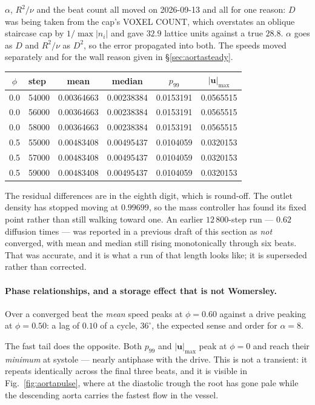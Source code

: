 \documentclass[11pt,a4paper]{article}
\newcommand{\uu}{\bm{u}}
\begin{document}
$\alpha$, $R^2/\nu$ and the beat count all moved on 2026-09-13 and all for one
reason: $D$ was being taken from the cap's VOXEL COUNT, which overstates an
oblique staircase cap by $1/\max|n_i|$ and gave $32.9$ lattice units against a
true $28.8$. $\alpha$ goes as $D$ and $R^2/\nu$ as $D^2$, so the error
propagated into both. The speeds moved separately and for the wall reason given
in \S\ref{sec:aortasteady}.

\begin{center}\small
\begin{tabular}{clcccc}
\hline
$\phi$ & step & mean & median & $p_{99}$ & $|\uu|_{\max}$ \\
\hline
0.0 & 54000 & 0.00364663 & 0.00238384 & 0.0153191 & 0.0565515 \\
0.0 & 56000 & 0.00364663 & 0.00238384 & 0.0153191 & 0.0565515 \\
0.0 & 58000 & 0.00364663 & 0.00238384 & 0.0153191 & 0.0565515 \\
0.5 & 55000 & 0.00483408 & 0.00495437 & 0.0104059 & 0.0320153 \\
0.5 & 57000 & 0.00483408 & 0.00495437 & 0.0104059 & 0.0320153 \\
0.5 & 59000 & 0.00483408 & 0.00495437 & 0.0104059 & 0.0320153 \\
\hline
\end{tabular}
\end{center}

\noindent The residual differences are in the eighth digit, which is round-off.
The outlet density has stopped moving at $0.99699$, so the mass controller has
found its fixed point rather than still walking toward one. An earlier
$12\,800$-step run --- $0.62$ diffusion times --- was reported in a previous
draft of this section as \emph{not} converged, with mean and median still rising
monotonically through six beats. That was accurate, and it is what a run of that
length looks like; it is superseded rather than corrected.

\paragraph{Phase relationships, and a storage effect that is not Womersley.}
Over a converged beat the \emph{mean} speed peaks at $\phi=0.60$ against a drive
peaking at $\phi=0.50$: a lag of $0.10$ of a cycle, $36^\circ$, the expected
sense and order for $\alpha=8$.

The fast tail does the opposite. Both $p_{99}$ and $|\uu|_{\max}$ peak at
$\phi=0$ and reach their \emph{minimum} at systole --- nearly antiphase with the
drive. This is not a transient: it repeats identically across the final three
beats, and it is visible in Fig.~\ref{fig:aortapulse}, where at the diastolic
trough the root has gone pale while the descending aorta carries the fastest
flow in the vessel.
\end{document}
